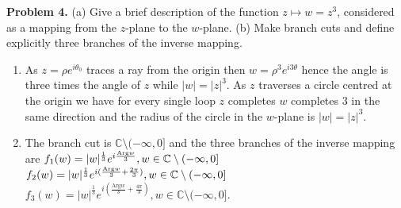 \documentclass[letter,12pt]{article}
\begin{document}
\begin{tcolorbox}
    \textbf{Problem 4.} (a) Give a brief description of the function $z\mapsto w=z^3$, considered as a mapping from the $z$-plane to the $w$-plane. (b) Make branch cuts and define explicitly three branches of the inverse mapping.
\end{tcolorbox}
\begin{enumerate}[label=(\alph*)]
    \item As $z=\rho e^{i\theta_0}$ traces a ray from the origin then $w=\rho^3 e^{i3\theta}$ hence the angle is three times the angle of $z$ while $|w|=|z|^3$. As $z$ traverses a circle centred at the origin we have for every single loop $z$ completes $w$ completes $3$ in the same direction and the radius of the circle in the $w$-plane is $|w|=|z|^3$.
    \item The branch cut is $\mathbb{C}\setminus (-\infty , 0]$ and the three branches of the inverse mapping are $f_1(w)=|w|^{\frac{1}{3}}e^{i \frac{\text{Arg}w}{3}},w\in \mathbb{C}\setminus (-\infty,0]\\$$f_2(w)=|w|^{\frac{1}{3}}e^{i(\frac{\text{Arg}w}{3}+\frac{2\pi}{3})},w\in \mathbb{C}\setminus (-\infty,0]\\$ $f_3(w)=|w|^{\frac{1}{3}}e^{i(\frac{\text{Arg}w}{3}+\frac{4\pi}{3})},w\in \mathbb{C}\setminus (-\infty,0]$.
\end{enumerate}



\end{document}
